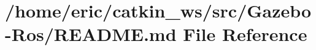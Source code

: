 \hypertarget{Gazebo-Ros_2README_8md}{}\section{/home/eric/catkin\+\_\+ws/src/\+Gazebo-\/\+Ros/\+R\+E\+A\+D\+ME.md File Reference}
\label{Gazebo-Ros_2README_8md}
